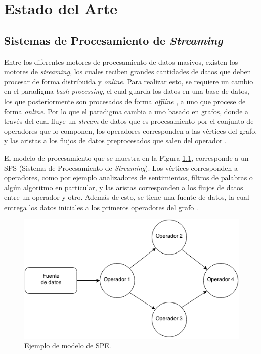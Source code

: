 \chapter{Estado del Arte}
\label{cap:estadoDelArte}

\section{Sistemas de Procesamiento de \textit{Streaming}}

Entre los diferentes motores de procesamiento de datos masivos, existen los motores de \textsl{streaming}, los cuales reciben grandes cantidades de datos que deben procesar de forma distribuida y \textsl{online}. Para realizar esto, se requiere un cambio en el paradigma \textsl{bash processing}, el cual guarda los datos en una base de datos, los que posteriormente son procesados de forma \textsl{offline} \citep{HawwashN14}, a uno que procese de forma \textsl{online}. Por lo que el paradigma cambia a uno basado en grafos, donde a través del cual fluye un \textsl{stream} de datos que es procesamiento por el conjunto de operadores que lo componen, los operadores corresponden a las vértices del grafo, y las aristas a los flujos de datos preprocesados que salen del operador \citep{Shahrivari14}.

El modelo de procesamiento que se muestra en la Figura \ref{fig:grafo}, corresponde a un SPS (Sistema de Procesamiento de \textit{Streaming}). Los vértices corresponden a operadores, como por ejemplo analizadores de sentimientos, filtros de palabras o algún algoritmo en particular, y las aristas corresponden a los flujos de datos entre un operador y otro. Además de esto, se tiene una fuente de datos, la cual entrega los datos iniciales a los primeros operadores del grafo \citep{AppelFFB12}.

\begin{figure}[ht!]
  \centering
    \includegraphics[scale=0.5]{images/Grafo.png}
  \caption{Ejemplo de modelo de SPE.}
  \label{fig:grafo}
\end{figure}

